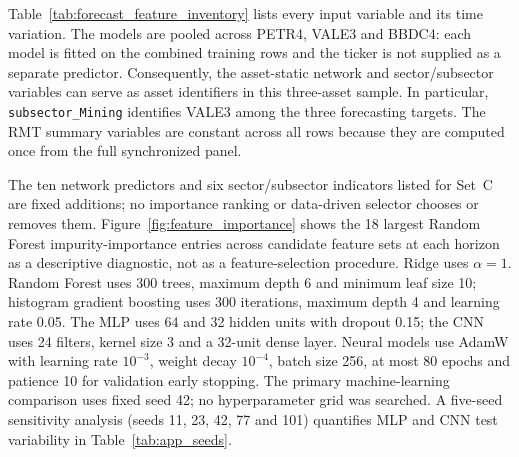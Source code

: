 Table~\ref{tab:forecast_feature_inventory} lists every input variable and its time variation. The models are pooled across PETR4, VALE3 and BBDC4: each model is fitted on the combined training rows and the ticker is not supplied as a separate predictor. Consequently, the asset-static network and sector/subsector variables can serve as asset identifiers in this three-asset sample. In particular, \texttt{subsector\_Mining} identifies VALE3 among the three forecasting targets. The RMT summary variables are constant across all rows because they are computed once from the full synchronized panel.

The ten network predictors and six sector/subsector indicators listed for Set~C are fixed additions; no importance ranking or data-driven selector chooses or removes them. Figure~\ref{fig:feature_importance} shows the 18 largest Random Forest impurity-importance entries across candidate feature sets at each horizon as a descriptive diagnostic, not as a feature-selection procedure. Ridge uses $\alpha=1$. Random Forest uses 300 trees, maximum depth 6 and minimum leaf size 10; histogram gradient boosting uses 300 iterations, maximum depth 4 and learning rate 0.05. The MLP uses 64 and 32 hidden units with dropout 0.15; the CNN uses 24 filters, kernel size 3 and a 32-unit dense layer. Neural models use AdamW with learning rate $10^{-3}$, weight decay $10^{-4}$, batch size 256, at most 80 epochs and patience 10 for validation early stopping. The primary machine-learning comparison uses fixed seed 42; no hyperparameter grid was searched. A five-seed sensitivity analysis (seeds 11, 23, 42, 77 and 101) quantifies MLP and CNN test variability in Table~\ref{tab:app_seeds}.

